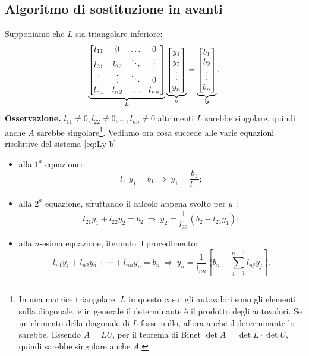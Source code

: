 \subsection{Algoritmo di sostituzione in avanti}
Supponiamo che $\displaystyle L$ sia triangolare inferiore:
\begin{equation}
\underbrace{\begin{bmatrix}
l_{11} & 0 & \dotsc  & 0\\
l_{21} & l_{22} & \ddots  & \vdots \\
\vdots  & \vdots  & \ddots  & 0\\
l_{n1} & l_{n2} & \dotsc  & l_{nn}
\end{bmatrix}}_{L}\underbrace{\begin{bmatrix}
y_{1}\\
y_{2}\\
\vdots \\
y_{n}
\end{bmatrix}}_{\mathbf{y}} =\underbrace{\begin{bmatrix}
b_{1}\\
b_{2}\\
\vdots \\
b_{n}
\end{bmatrix}}_{\mathbf{b}}.
\label{eq:Ly-b}
\end{equation}
\textbf{Osservazione. }$\displaystyle l_{11} \neq 0,l_{22} \neq 0,\dotsc ,l_{nn} \neq 0$ altrimenti $\displaystyle L$ sarebbe singolare, quindi anche $\displaystyle A$ sarebbe singolare\footnote{In una matrice triangolare, $L$ in questo caso, gli autovalori sono gli elementi sulla diagonale, e in generale il determinante è il prodotto degli autovalori. Se un elemento della diagonale di $L$ fosse nullo, allora anche il determinante lo sarebbe. Essendo $A=LU$, per il teorema di Binet $\operatorname{det}A=\operatorname{det}L\cdot\operatorname{det}U$, quindi sarebbe singolare anche $A$.}. Vediamo ora cosa succede alle varie equazioni risolutive del sistema \eqref{eq:Ly-b}
\begin{itemize}
\item alla $1^{a}$ equazione:
\begin{equation*}
l_{11} y_{1} =b_{1} \ \Rightarrow \ y_{1} =\frac{b_{1}}{l_{11}};
\end{equation*}
\item alla $2^{a}$ equazione, sfruttando il calcolo appena svolto per $y_{1}$:
\begin{equation*}
l_{21} y_{1} +l_{22} y_{2} =b_{2} \ \Rightarrow \ y_{2} =\frac{1}{l_{22}}( b_{2} -l_{21} y_{1});
\end{equation*}
\item alla $n$-esima equazione, iterando il procedimento:
\begin{equation*}
l_{n1} y_{1} +l_{n2} y_{2} +\cdots +l_{nn} y_{n} =b_{n} \ \Rightarrow \ y_{n} =\frac{1}{l_{nn}}\left[ b_{n} -\sum ^{n-1}_{j=1} l_{nj} y_{j}\right].
\end{equation*}
\end{itemize}

